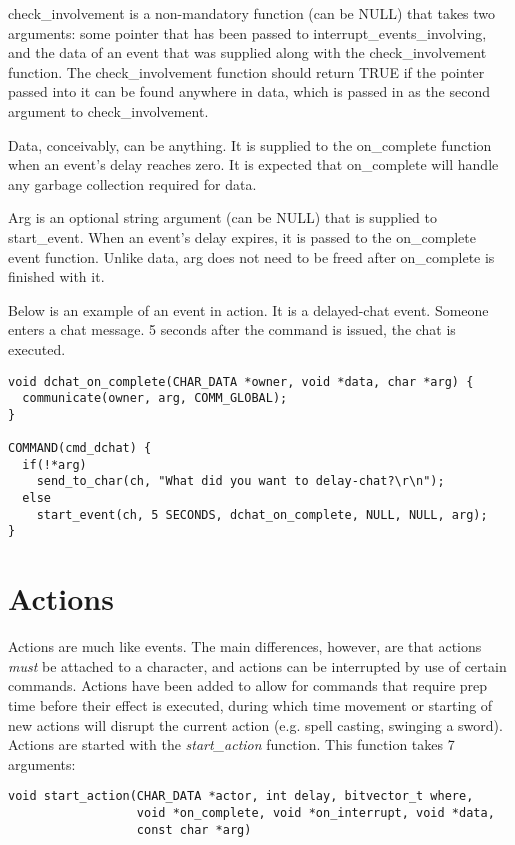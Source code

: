 \documentclass[fignum,doc]{article}
\begin{document}
\begin{doublespace}
check\_involvement is a non-mandatory function (can be NULL) that takes two arguments: some pointer that has been passed to interrupt\_events\_involving, and the data of an event that was supplied along with the check\_involvement function. The check\_involvement function should return TRUE if the pointer passed into it can be found anywhere in data, which is passed in as the second argument to check\_involvement.

Data, conceivably, can be anything. It is supplied to the on\_complete function when an event's delay reaches zero. It is expected that on\_complete will handle any garbage collection required for data.

Arg is an optional string argument (can be NULL) that is supplied to start\_event. When an event's delay expires, it is passed to the on\_complete event function. Unlike data, arg does not need to be freed after on\_complete is finished with it.

Below is an example of an event in action. It is a delayed-chat event. Someone enters a chat message. 5 seconds after the command is issued, the chat is executed.

\begin{singlespace}\begin{verbatim}
void dchat_on_complete(CHAR_DATA *owner, void *data, char *arg) {
  communicate(owner, arg, COMM_GLOBAL);
}

COMMAND(cmd_dchat) {
  if(!*arg)
    send_to_char(ch, "What did you want to delay-chat?\r\n");
  else
    start_event(ch, 5 SECONDS, dchat_on_complete, NULL, NULL, arg);
}
\end{verbatim}\end{singlespace}



\section{Actions}
Actions are much like events. The main differences, however, are that actions {\it must} be attached to a character, and actions can be interrupted by use of certain commands. Actions have been added to allow for commands that require prep time before their effect is executed, during which time movement or starting of new actions will disrupt the current action (e.g. spell casting, swinging a sword). Actions are started with the {\it start\_action} function. This function takes 7 arguments:
\begin{verbatim}
void start_action(CHAR_DATA *actor, int delay, bitvector_t where, 
                  void *on_complete, void *on_interrupt, void *data,
                  const char *arg)
\end{verbatim}


\end{doublespace}
\end{document}
